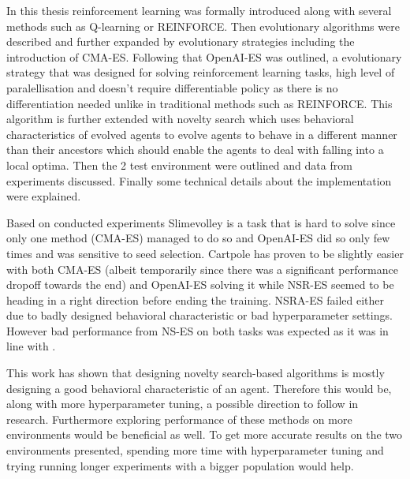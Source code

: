 

In this thesis reinforcement learning was formally introduced along with several methods such as Q-learning or REINFORCE. Then evolutionary algorithms were described and further expanded by evolutionary strategies including the introduction of CMA-ES. Following that OpenAI-ES was outlined, a evolutionary strategy that was designed for solving reinforcement learning tasks, high level of paralellisation and doesn't require differentiable policy as there is no differentiation needed unlike in traditional methods such as REINFORCE. This algorithm is further extended with novelty search which uses behavioral characteristics of evolved agents to evolve agents to behave in a different manner than their ancestors which should enable the agents to deal with falling into a local optima. Then the 2 test environment were outlined and data from experiments discussed. Finally some technical details about the implementation were explained.

Based on conducted experiments Slimevolley is a task that is hard to solve since only one method (CMA-ES) managed to do so and OpenAI-ES did so only few times and was sensitive to seed selection. Cartpole has proven to be slightly easier with both CMA-ES (albeit temporarily since there was a significant performance dropoff towards the end) and OpenAI-ES solving it while NSR-ES seemed to be heading in a right direction before ending the training. NSRA-ES failed either due to badly designed behavioral characteristic or bad hyperparameter settings. However bad performance from NS-ES on both tasks was expected as it was in line with \cite{conti2018}.

This work has shown that designing novelty search-based algorithms is mostly designing a good behavioral characteristic of an agent. Therefore this would be, along with more hyperparameter tuning, a possible direction to follow in research. Furthermore exploring performance of these methods on more environments would be beneficial as well. To get more accurate results on the two environments presented, spending more time with hyperparameter tuning and trying running longer experiments with a bigger population would help.




